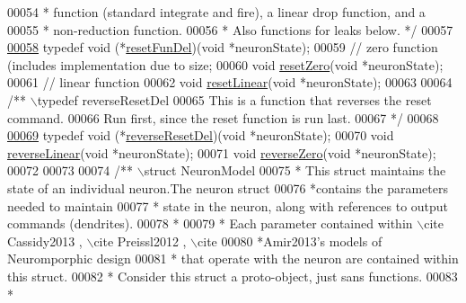 \begin{DoxyCode}
00054 \textcolor{comment}{ *  function (standard integrate and fire), a linear drop function, and a}
00055 \textcolor{comment}{ * non-reduction function.}
00056 \textcolor{comment}{ *  Also functions for leaks below. */}
00057 
\hypertarget{neuron_8h_source_l00058}{}\hyperlink{neuron_8h_ae7e5990745cd949246894bfb633ca4a2}{00058} \textcolor{keyword}{typedef} \textcolor{keywordtype}{void} (*\hyperlink{neuron_8h_ae7e5990745cd949246894bfb633ca4a2}{resetFunDel})(\textcolor{keywordtype}{void} *neuronState);
00059     \textcolor{comment}{// zero function (includes implementation due to size;}
00060 \textcolor{keywordtype}{void} \hyperlink{neuron_8h_a7f8eaa35f03747c795a2b727b364537b}{resetZero}(\textcolor{keywordtype}{void} *neuronState);
00061     \textcolor{comment}{// linear function}
00062 \textcolor{keywordtype}{void} \hyperlink{neuron_8h_a2e78d7d2b70bf7349c3854b3727dcc25}{resetLinear}(\textcolor{keywordtype}{void} *neuronState);
00063 
00064 \textcolor{comment}{/** \(\backslash\)typedef reverseResetDel}
00065 \textcolor{comment}{ This is a function that reverses the reset command.}
00066 \textcolor{comment}{ Run first, since the reset function is run last.}
00067 \textcolor{comment}{ */}
00068 
\hypertarget{neuron_8h_source_l00069}{}\hyperlink{neuron_8h_aa939c0acc5b3367975f2f0cb7bc36d17}{00069} \textcolor{keyword}{typedef} \textcolor{keywordtype}{void} (*\hyperlink{neuron_8h_aa939c0acc5b3367975f2f0cb7bc36d17}{reverseResetDel})(\textcolor{keywordtype}{void} *neuronState);
00070 \textcolor{keywordtype}{void} \hyperlink{neuron_8h_aabae9811b1573f5c38f4d32446c9c80a}{reverseLinear}(\textcolor{keywordtype}{void} *neuronState);
00071 \textcolor{keywordtype}{void} \hyperlink{neuron_8h_a286a9f9e22acec028acf23b62e13646b}{reverseZero}(\textcolor{keywordtype}{void} *neuronState);
00072 
00073 
00074 \textcolor{comment}{/** \(\backslash\)struct NeuronModel}
00075 \textcolor{comment}{* This struct maintains the state of an individual neuron.The neuron struct}
00076 \textcolor{comment}{*contains the parameters needed to maintain}
00077 \textcolor{comment}{* state in the neuron, along with references to output commands (dendrites).}
00078 \textcolor{comment}{*}
00079 \textcolor{comment}{* Each parameter contained within \(\backslash\)cite Cassidy2013 , \(\backslash\)cite Preissl2012 , \(\backslash\)cite}
00080 \textcolor{comment}{*Amir2013's models of Neuromporphic design}
00081 \textcolor{comment}{* that operate with the neuron are contained within this struct.}
00082 \textcolor{comment}{* Consider this struct a proto-object, just sans functions.}
00083 \textcolor{comment}{*}

\end{DoxyCode}
